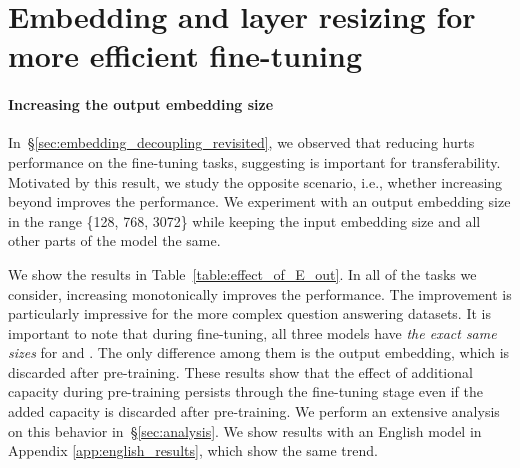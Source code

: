 \documentclass{article} \usepackage{iclr2021_conference,times}
\newcommand{\xtreme}{\textsc{xtreme}\xspace}
\begin{document}
\section{Embedding and layer resizing for more efficient fine-tuning}






\paragraph{Increasing the output embedding size}
In~\S\ref{sec:embedding_decoupling_revisited}, we observed that reducing  hurts performance on the fine-tuning tasks, suggesting  is important for transferability. Motivated by this result, we study the opposite scenario, i.e., whether increasing  beyond  improves the performance. We experiment with an output embedding size  in the range \{128, 768, 3072\} while keeping the input embedding size  and all other parts of the model the same.





We show the results in Table~\ref{table:effect_of_E_out}. In all of the tasks we consider, increasing  monotonically improves the performance. The improvement is particularly impressive for the more complex question answering datasets. It is important to note that during fine-tuning, all three models have \emph{the exact same sizes} for  and . The only difference among them is the output embedding, which is discarded after pre-training. These results show that the effect of additional capacity during pre-training persists through the fine-tuning stage even if the added capacity is discarded after pre-training. We perform an extensive analysis on this behavior in~\S\ref{sec:analysis}. We show results with an English  model in Appendix \ref{app:english_results}, which show the same trend. 




\begin{table*}[t]
\caption{Effect of an increased output embedding size  on tasks in \xtreme (). 
}
\label{table:effect_of_E_out}
\begin{center}
\end{center}
\end{table*}
\end{document}
